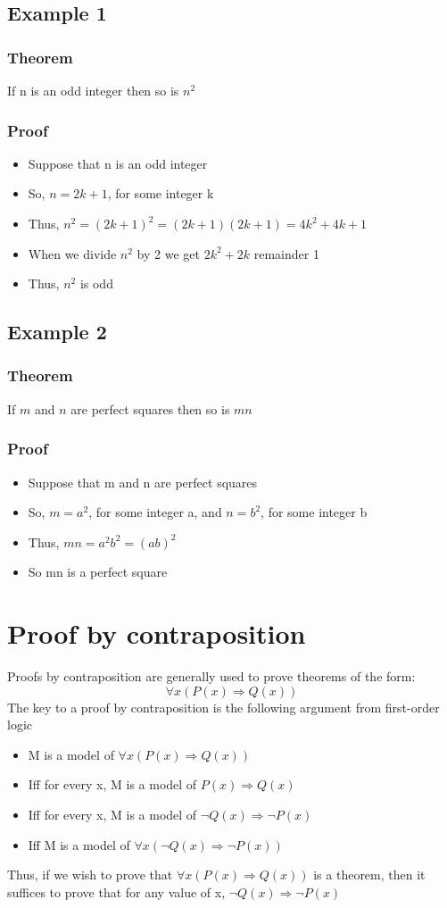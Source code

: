 \documentclass{article}[18pt]
\begin{document}
\subsection{Example 1}
\subsubsection{Theorem}
If n is an odd integer then so is $n^2$
\subsubsection{Proof}
\begin{itemize}
	\item Suppose that n is an odd integer
	\item So, $n=2k+1$, for some integer k
	\item Thus, $n^{2}=(2 k+1)^{2}=(2 k+1)(2 k+1)=4 k^{2}+4 k+1$
	\item When we divide $n^2$ by 2 we get $2k^2+2k$ remainder 1
	\item Thus, $n^2$ is odd
\end{itemize}
\subsection{Example 2}
\subsubsection{Theorem}
If $m$ and $n$ are perfect squares then so is $mn$
\subsubsection{Proof}
\begin{itemize}
	\item Suppose that m and n are perfect squares
	\item So, $m=a^2$, for some integer a, and $n=b^2$, for some integer b
	\item Thus, $mn=a^2b^2=(ab)^2$
	\item So mn is a perfect square
\end{itemize}
\section{Proof by contraposition}
Proofs by contraposition are generally used to prove theorems of the form:
$$\forall x(P(x)\Rightarrow Q(x))$$
The key to a proof by contraposition is the following argument from first-order logic
\begin{itemize}
	\item M is a model of $\forall x(P(x)\Rightarrow Q(x))$
	\item Iff for every x, M is a model of $P(x)\Rightarrow Q(x)$
	\item Iff for every x, M is a model of $\lnot Q(x)\Rightarrow \lnot P(x)$
	\item Iff M is a model of $\forall x(\lnot Q(x)\Rightarrow \lnot P(x))$
\end{itemize}
Thus, if we wish to prove that $\forall x(P(x)\Rightarrow Q(x))$ is a theorem, then it suffices to prove that for any value of x, $\lnot Q(x)\Rightarrow \lnot P(x)$
\end{document}
